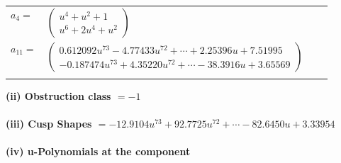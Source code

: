 \documentclass[1p]{elsarticle_modified}
\theoremstyle{definition}
\begin{document}
\begin{tabular}{m{7pt} m{180pt} m{7pt} m{180pt} }
\flushright $a_{4}=$&$\begin{pmatrix}u^4+u^2+1\\u^6+2 u^4+u^2\end{pmatrix}$ \\
\flushright $a_{11}=$&$\begin{pmatrix}0.612092 u^{73}-4.77433 u^{72}+\cdots+2.25396 u+7.51995\\-0.187474 u^{73}+4.35220 u^{72}+\cdots-38.3916 u+3.65569\end{pmatrix}$\\&\end{tabular}
\flushleft \textbf{(ii) Obstruction class $= -1$}\\~\\
\flushleft \textbf{(iii) Cusp Shapes $= -12.9104 u^{73}+92.7725 u^{72}+\cdots-82.6450 u+3.33954$}\\~\\
\newpage\renewcommand{\arraystretch}{1}
\flushleft \textbf{(iv) u-Polynomials at the component}\newline \\
\end{document}
